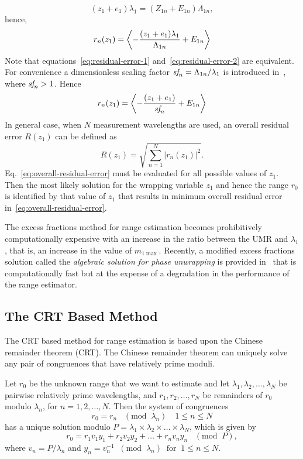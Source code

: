 \[
(z_1 + e_1)\lambda_1 = (Z_{1n} + E_{1n})\Lambda_{1n},
\]
hence,
\begin{equation}\label{eq:residual-error-2}
r_n (z_1) = \left\langle  - \dfrac{(z_1 + e_1)\lambda_1}{\Lambda_{1n}} + E_{1n} \right\rangle
\end{equation}
Note that equations~\ref{eq:residual-error-1} and~\ref{eq:residual-error-2} are equivalent. For convenience a dimensionless scaling factor $\emph{sf}_n= \Lambda_{1n}/\lambda_1$ is introduced in~\cite{Falaggis_excess_fractions_2011}, where $\emph{sf}_n> 1$. Hence
\begin{equation}\label{eq:residual-error-3}
r_n (z_1) = \left\langle  - \dfrac{(z_1 + e_1)}{\emph{sf}_n} + E_{1n} \right\rangle
\end{equation}
In general case, when $N$ measurement wavelengths are used, an overall residual error $R(z_1)$ can be defined as~\cite{Falaggis_excess_fractions_2011}
\begin{equation}\label{eq:overall-residual-error}
R(z_1) = \sqrt{ \sum_{n=1}^{N} | r_n(z_1) |^2  }. 
\end{equation}
Eq.~\ref{eq:overall-residual-error} must be evaluated for all possible values of $z_1$. Then the most likely solution for the wrapping variable $z_1$ and hence the range $r_0$ is identified by that value of $z_1$ that results in minimum overall residual error in~\ref{eq:overall-residual-error}.

The excess fractions method for range estimation becomes prohibitively computationally expensive with an increase in the ratio between the UMR and $\lambda_1$, that is, an increase in the value of $m_{1\max}$. Recently, a modified excess fractions solution called the \emph{algebraic solution for phase unwrapping} is provided in~\cite{Falaggis_algebraic_solution_2014} that is computationally fast but at the expense of a degradation in the performance of the range estimator.

\subsection{The CRT Based Method}
The CRT based method for range estimation is based upon the Chinese remainder theorem (CRT). The Chinese remainder theorem can uniquely solve any pair of congruences that have relatively prime moduli. 

Let $r_0$ be the unknown range that we want to estimate and let $\lambda_1, \lambda_2, \ldots,\lambda_N$ be pairwise relatively prime wavelengths, and $r_1,r_2,\ldots,r_N$ be remainders of $r_0$ modulo $\lambda_n$, for $n=1,2,\ldots,N$. Then the system of congruences 
 \[
 r_0 = r_n \;\;\; (\text{mod}\;\; \lambda_n) \quad 1\leq n \leq N
 \]
 has a unique solution modulo $P = \lambda_1 \times \lambda_2 \times \ldots \times \lambda_N$, which is given by
 \[
 r_0 = r_1 v_1 y_1 + r_2 v_2 y_2 + \ldots + r_n v_n y_n \;\;\; (\text{mod}\;\; P),
 \]
 where $v_n = P/\lambda_n$ and $y_n = v_n^{-1} \;\; (\text{mod}\;\; \lambda_n) \;\; \text{for} \;\; 1 \leq n \leq N$.

